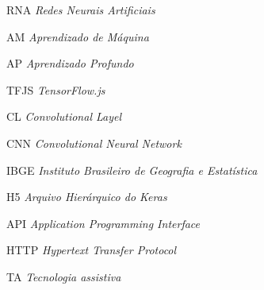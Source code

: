 \begin{siglas}
	\item[RNA] \emph{Redes Neurais Artificiais}
	\item[AM] \emph{Aprendizado de Máquina}
	\item[AP] \emph{Aprendizado Profundo}
	\item[TFJS] \emph{TensorFlow.js}
	\item[CL] \emph{Convolutional Layel}
	\item[CNN] \emph{Convolutional Neural Network}
	\item[IBGE] \emph{Instituto Brasileiro de Geografia e Estatística}
	\item[H5] \emph{Arquivo Hierárquico do Keras}
	\item[API] \emph{Application Programming Interface}
	\item[HTTP] \emph{Hypertext Transfer Protocol}
	\item[TA] \emph{Tecnologia assistiva}
\end{siglas}
